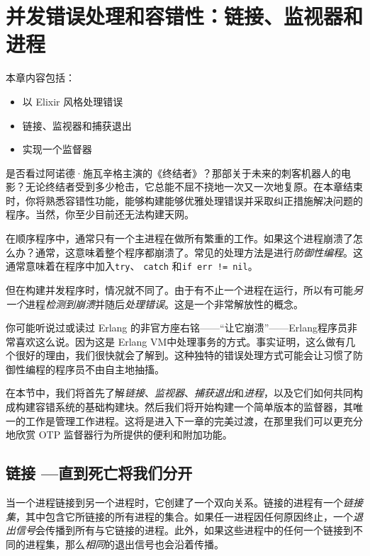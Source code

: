 \chapter{并发错误处理和容错性：链接、监视器和进程}\label{chapt:concurrent}

本章内容包括：

\begin{itemize}

\item  以 Elixir 风格处理错误
\item  链接、监视器和捕获退出
\item  实现一个监督器
\end{itemize}

是否看过阿诺德·施瓦辛格主演的《终结者》？那部关于未来的刺客机器人的电影？无论终结者受到多少枪击，它总能不屈不挠地一次又一次地复原。在本章结束时，你将熟悉容错性功能，能够构建能够优雅处理错误并采取纠正措施解决问题的程序。当然，你至少目前还无法构建天网。

在顺序程序中，通常只有一个主进程在做所有繁重的工作。如果这个进程崩溃了怎么办？通常，这意味着整个程序都崩溃了。常见的处理方法是进行\emph{防御性编程}。这通常意味着在程序中加入\texttt{try}、 \texttt{catch} 和\texttt{if err != nil}。

但在构建并发程序时，情况就不同了。由于有不止一个进程在运行，所以有可能\emph{另一个}进程\emph{检测到崩溃}并随后\emph{处理错误}。这是一个非常解放性的概念。

你可能听说过或读过 Erlang 的非官方座右铭------``让它崩溃''------Erlang程序员非常喜欢这么说。因为这是 Erlang VM中处理事务的方式。事实证明，这么做有几个很好的理由，我们很快就会了解到。这种独特的错误处理方式可能会让习惯了防御性编程的程序员不由自主地抽搐。

在本节中，我们将首先了解\emph{链接}、\emph{监视器}、\emph{捕获退出}和\emph{进程}，以及它们如何共同构成构建容错系统的基础构建块。然后我们将开始构建一个简单版本的监督器，其唯一的工作是管理工作进程。这将是进入下一章的完美过渡，在那里我们可以更充分地欣赏
OTP 监督器行为所提供的便利和附加功能。

\section{链接 ---直到死亡将我们分开}

当一个进程链接到另一个进程时，它创建了一个双向关系。链接的进程有一个\emph{链接集}，其中包含它所链接的所有进程的集合。如果任一进程因任何原因终止，一个\emph{退出信号}会传播到所有与它链接的进程。此外，如果这些进程中的任何一个链接到不同的进程集，那么\emph{相同}的退出信号也会沿着传播。

